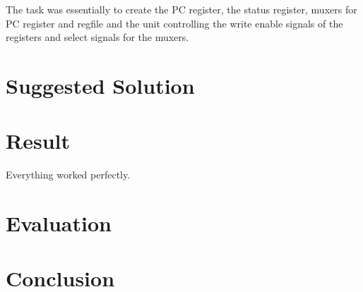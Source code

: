 \documentclass[11pt]{article}
\begin{document}
	The task was essentially to create the PC register, the status register, muxers for PC register and regfile and the unit controlling the write enable signals of the registers and select signals for the muxers. 

	\section*{Suggested Solution}


	\section*{Result}


	Everything worked perfectly.

	\section*{Evaluation}


	\section*{Conclusion}

\end{document}
